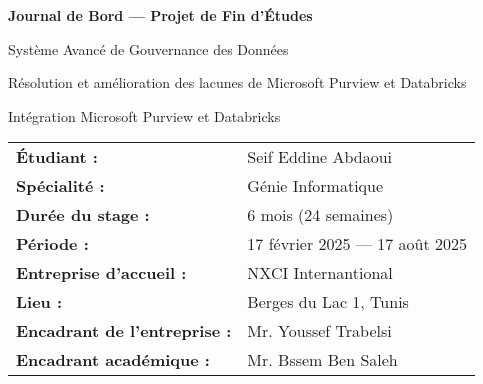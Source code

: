 \documentclass[12pt,a4paper]{article}
\begin{document}
\begin{titlepage}
  \centering
  \vspace*{1.2cm}


    {\LARGE\bfseries\color{primaryblue} Journal de Bord — Projet de Fin d'Études\par}
  \vspace{0.6cm}
  {\Large Système Avancé de Gouvernance des Données\par}
  {\normalsize Résolution et amélioration des lacunes de Microsoft Purview et Databricks\par}
  {\normalsize Intégration Microsoft Purview et Databricks\par}

  \vspace{1.2cm}
  \begin{tcolorbox}[colback=white,colframe=primaryblue,boxrule=0.8pt,arc=1mm,enhanced,width=0.9\textwidth]
    \renewcommand{\arraystretch}{1.35}%
    \setlength{\tabcolsep}{6pt}%
    \begin{tabular}{@{}p{6.0cm} p{9.2cm}@{}}
      \textbf{Étudiant :} & Seif Eddine Abdaoui \\[4pt]
      \textbf{Spécialité :} & Génie Informatique \\[4pt]
      \textbf{Durée du stage :} & 6 mois (24 semaines) \\[4pt]
      \textbf{Période :} & 17 février 2025 — 17 août 2025 \\[4pt]
      \textbf{Entreprise d'accueil :} & NXCI Internantional \\[4pt]
      \textbf{Lieu :} & Berges du Lac 1, Tunis \\[4pt]
      \textbf{Encadrant de l'entreprise :} & Mr. Youssef Trabelsi \\[4pt]
      \textbf{Encadrant académique :} & Mr. Bssem Ben Saleh \\
    \end{tabular}
  \end{tcolorbox}


\end{titlepage}
\end{document}
